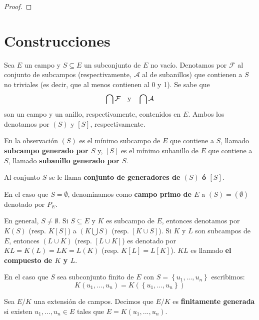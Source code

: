 \documentclass[12pt]{report}
\theoremstyle{largebreak}
\begin{document}
    \begin{proof}
        
    \end{proof}

    \section{Construcciones}

    \begin{obs}
        Sea $E$ un campo y $S\subseteq E$ un subconjunto de $E$ no vacío. Denotamos por $\mathcal{F}$ al conjunto de subcampos (respectivamente, $\mathcal{A}$ al de subanillos) que contienen a $S$ no triviales (es decir, que al menos contienen al 0 y 1). Se sabe que
        \begin{equation*}
            \bigcap\mathcal{F}\quad\textup{y}\quad\bigcap\mathcal{A}
        \end{equation*}
        son un campo y un anillo, respectivamente, contenidos en $E$. Ambos los denotamos por $(S)$ y $[S]$, respectivamente.
    \end{obs}

    \begin{mydef}
        En la observación $(S)$ es el mínimo subcampo de $E$ que contiene a $S$, llamado \textbf{subcampo generado por $S$} y, $[S]$ es el mínimo subanillo de $E$ que contiene a $S$, llamado \textbf{subanillo generado por $S$}.

        Al conjunto $S$ se le llama \textbf{conjunto de generadores de $(S)$ ó $[S]$}.

        En el caso que $S=\emptyset$, denominamos como \textbf{campo primo de $E$} a $(S)=(\emptyset)$ denotado por $P_E$.
    \end{mydef}

    \begin{obs}
        En general, $S\neq\emptyset$. Si $S\subseteq E$ y $K$ es subcampo de $E$, entonces denotamos por $K(S)$ (resp. $K[S]$) a $(K\bigcup S)$ (resp. $[K\cup S]$). Si $K$ y $L$ son subcampos de $E$, entonces $(L\cup K)$ (resp. $[L\cup K]$) es denotado por $KL=K(L)=LK=L(K)$ (resp. $K[L]=L[K]$). $KL$ es llamado \textbf{el compuesto de $K$ y $L$}.

        En el caso que $S$ sea subconjunto finito de $E$ con $S=\left\{u_1,...,u_n \right\}$ escribimos:
        \begin{equation*}
            K(u_1,...,u_n)=K(\left\{u_1,...,u_n \right\})
        \end{equation*}
    \end{obs}

    \begin{mydef}
        Sea $E/K$ una extensión de campos. Decimos que $E/K$ es \textbf{finitamente generada} si existen $u_1,...,u_n\in E$ tales que $E=K(u_1,...,u_n)$.
    \end{mydef}
\end{document}
